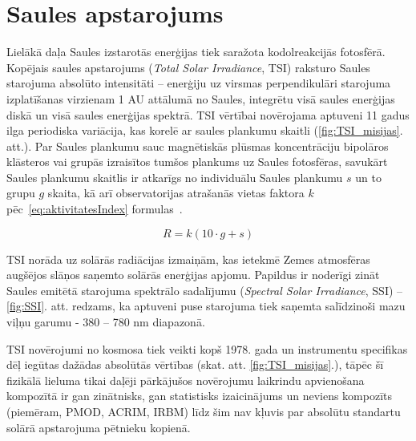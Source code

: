 \section{Saules apstarojums}

Lielākā daļa Saules izstarotās enerģijas tiek saražota kodolreakcijās fotosfērā. 
Kopējais saules apstarojums (\textit{Total Solar Irradiance}, TSI) raksturo Saules starojuma absolūto intensitāti -- enerģiju uz virsmas perpendikulāri starojuma izplatīšanas virzienam 1 AU attālumā no Saules, integrētu visā saules enerģijas diskā un visā saules enerģijas spektrā. TSI vērtībai novērojama aptuveni 11 gadus ilga periodiska variācija, kas korelē ar saules plankumu skaitli (\ref{fig:TSI_misijas}. att.). Par Saules plankumu sauc magnētiskās plūsmas koncentrāciju bipolāros klāsteros vai grupās izraisītos tumšos plankums uz Saules fotosfēras, savukārt Saules plankumu skaitlis ir atkarīgs no individuālu Saules plankumu $s$ un to grupu $g$ skaita, kā arī observatorijas atrašanās vietas faktora $k$
pēc~\ref{eq:aktivitatesIndex} formulas~\cite{ThermalProcesses}.

\begin{equation}
\label{eq:aktivitatesIndex}
R = k(10 \cdot g + s)
\end{equation}

TSI norāda uz solārās radiācijas izmaiņām, kas ietekmē Zemes atmosfēras augšējos slāņos saņemto solārās enerģijas apjomu. Papildus ir noderīgi zināt Saules emitētā starojuma spektrālo sadalījumu (\textit{Spectral Solar Irradiance}, SSI) -- \ref{fig:SSI}. att. redzams, ka aptuveni puse starojuma tiek saņemta salīdzinoši mazu viļņu garumu - 380 -- 780 nm diapazonā.

TSI novērojumi no kosmosa tiek veikti kopš 1978. gada un instrumentu specifikas dēļ iegūtas dažādas absolūtās vērtības (skat. att. \ref{fig:TSI_misijas}.), tāpēc šī fizikālā lieluma tikai daļēji pārkājušos novērojumu laikrindu apvienošana kompozītā ir gan zinātnisks, gan statistisks izaicinājums un neviens kompozīts (piemēram, PMOD, ACRIM, IRBM) līdz šim nav kļuvis par absolūtu standartu solārā apstarojuma pētnieku kopienā.

